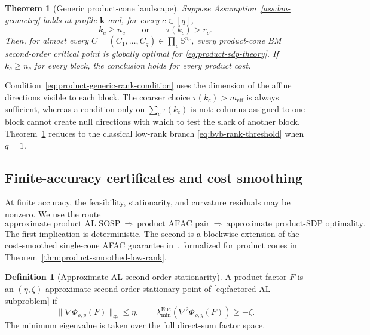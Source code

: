 \documentclass[11pt]{article}
\newtheorem{theorem}{Theorem}
\theoremstyle{definition}
\newtheorem{definition}{Definition}
\theoremstyle{remark}
\begin{document}
\begin{theorem}[Generic product-cone landscape]
\label{thm:product-generic-landscape}
Suppose Assumption~\ref{ass:bm-geometry} holds at profile $\mathbf k$ and,
for every $c\in[q]$,
\begin{equation}
  k_c\geq n_c
  \qquad\text{or}\qquad
  \tau(k_c)>r_c.
  \label{eq:product-generic-rank-condition}
\end{equation}
Then, for almost every
$C=(C_1,\ldots,C_q)\in\prod_c\mathbb S^{n_c}$, every product-cone BM
second-order critical point is globally optimal for
\eqref{eq:product-sdp-theory}.  If $k_c\geq n_c$ for every block, the
conclusion holds for every product cost.
\end{theorem}

Condition~\eqref{eq:product-generic-rank-condition} uses the dimension of the
affine directions visible to each block.  The coarser choice
$\tau(k_c)>m_{\mathrm{eff}}$ is always sufficient, whereas a condition only
on $\sum_c\tau(k_c)$ is not: columns assigned to one block cannot create
null directions with which to test the slack of another block.
Theorem~\ref{thm:product-generic-landscape} reduces to the classical
low-rank branch
\eqref{eq:bvb-rank-threshold} when $q=1$.

\subsection{Finite-accuracy certificates and cost smoothing}
\label{subsec:finite-accuracy}

At finite accuracy, the feasibility, stationarity, and curvature residuals may
be nonzero.  We use the route
\[
  \text{approximate product AL SOSP}
  \ \Longrightarrow\
  \text{product AFAC pair}
  \ \Longrightarrow\
  \text{approximate product-SDP optimality}.
\]
The first implication is deterministic.  The second is a blockwise extension
of the cost-smoothed single-cone AFAC guarantee
in~\cite[Theorem~6]{cifuentes2022polynomial}, formalized for product cones in
Theorem~\ref{thm:product-smoothed-low-rank}.

\begin{definition}[Approximate AL second-order stationarity]
\label{def:approx-sosp}
A product factor $F$ is an $(\eta,\zeta)$-approximate second-order
stationary point of \eqref{eq:factored-AL-subproblem} if
\begin{equation}
  \|\nabla\Phi_{\rho,y}(F)\|_\oplus\leq\eta,
  \qquad
  \lambda_{\min}^{\mathrm{Euc}}
  \!\left(\nabla^2\Phi_{\rho,y}(F)\right)\geq-\zeta.
  \label{eq:approx-AL-SOSP}
\end{equation}
The minimum eigenvalue is taken over the full direct-sum factor space.
\end{definition}
\end{document}
